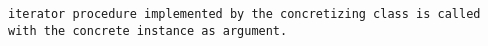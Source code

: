 
\tt{iterator} procedure implemented by the concretizing
class is called with the concrete instance as argument.
